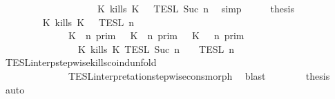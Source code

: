 \begin{isabellebody}
\ \ \ \ \ \ \ \ \ \ \ \ \ \ \ \ \ \ {\isasyminter}\ {\isasymlbrakk}{\isasymlbrakk}\ {\isacharparenleft}K\ kills\ K\ {\isacharhash}\ {\isasymPhi}\ {\isasymrbrakk}{\isasymrbrakk}\isactrlsub T\isactrlsub E\isactrlsub S\isactrlsub L\isactrlbsup {\isasymge}\ Suc\ n\isactrlesup {\isacartoucheclose}\ \isamarkupfalse%
\ simp\isanewline
\ \ \isamarkupfalse%
\ \isamarkupfalse%
\ {\isacharquery}thesis\isanewline
\ \ \ \ \isamarkupfalse%
\ {\isacharminus}\isanewline
\ \ \ \ \ \ \isamarkupfalse%
\ {\isacartoucheopen}{\isasymlbrakk}{\isasymlbrakk}\ {\isacharparenleft}K\ kills\ K\ {\isacharhash}\ {\isasymPsi}\ {\isasymrbrakk}{\isasymrbrakk}\isactrlsub T\isactrlsub E\isactrlsub S\isactrlsub L\isactrlbsup {\isasymge}\ n\isactrlesup \isanewline
\ \ \ \ \ \ \ \ \ \ \ \ {\isacharequal}\ {\isacharparenleft}{\isasymlbrakk}\ {\isacharparenleft}K\ {\isasymnot}{\isasymUp}\ n{\isacharparenright}\ {\isasymrbrakk}\isactrlsub p\isactrlsub r\isactrlsub i\isactrlsub m\ {\isasymunion}\ {\isasymlbrakk}\ {\isacharparenleft}K\ {\isasymUp}\ n{\isacharparenright}\ {\isasymrbrakk}\isactrlsub p\isactrlsub r\isactrlsub i\isactrlsub m\ {\isasyminter}\ {\isasymlbrakk}\ {\isacharparenleft}K\ {\isasymnot}{\isasymUp}\ {\isasymge}\ n{\isacharparenright}\ {\isasymrbrakk}\isactrlsub p\isactrlsub r\isactrlsub i\isactrlsub m{\isacharparenright}\isanewline
\ \ \ \ \ \ \ \ \ \ \ \ \ \ {\isasyminter}\ {\isasymlbrakk}\ {\isacharparenleft}K\ kills\ K\ {\isasymrbrakk}\isactrlsub T\isactrlsub E\isactrlsub S\isactrlsub L\isactrlbsup {\isasymge}\ Suc\ n\isactrlesup \ {\isasyminter}\ {\isasymlbrakk}{\isasymlbrakk}\ {\isasymPsi}\ {\isasymrbrakk}{\isasymrbrakk}\isactrlsub T\isactrlsub E\isactrlsub S\isactrlsub L\isactrlbsup {\isasymge}\ n\isactrlesup {\isacartoucheclose}\isanewline
\ \ \ \ \ \ \ \ \isamarkupfalse%
\ TESL{\isacharunderscore}interp{\isacharunderscore}stepwise{\isacharunderscore}kills{\isacharunderscore}coind{\isacharunderscore}unfold\isanewline
\ \ \ \ \ \ \ \ \ \ \ \ \ \ TESL{\isacharunderscore}interpretation{\isacharunderscore}stepwise{\isacharunderscore}cons{\isacharunderscore}morph\ \isamarkupfalse%
\ blast\isanewline
\ \ \ \ \ \ \isamarkupfalse%
\ {\isacharquery}thesis\ \isamarkupfalse%
\ auto\isanewline
\ \ \ \ \isamarkupfalse%
\isanewline
{}\isamarkupfalse%
%
\endisatagproof
{\isafoldproof}%
%
\isadelimproof
\isanewline
%
\endisadelimproof
%
\isadelimtheory
\isanewline
%
\endisadelimtheory
%
\isatagtheory
{}\isamarkupfalse%
%
\endisatagtheory
{\isafoldtheory}%
%
\isadelimtheory
%
\endisadelimtheory
%
\end{isabellebody}%
